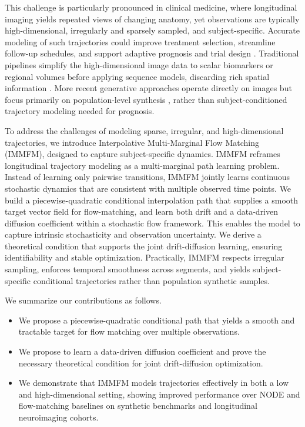 \documentclass[twoside]{article}
\begin{document}
This challenge is particularly pronounced in clinical medicine, where longitudinal imaging yields repeated views of changing anatomy, yet observations are typically high-dimensional, irregularly and sparsely sampled, and subject-specific.
Accurate modeling of such trajectories could improve treatment selection, streamline follow-up schedules, and support adaptive prognosis and trial design \citep{caruana2015longitudinal,locascio2011overview}.
Traditional pipelines simplify the high-dimensional image data to scalar biomarkers or regional volumes before applying sequence models, discarding rich spatial information \citep{lachinov2023learning,lu2024cats,ruan2024comprehensive,lyu2023multimodal,sun2023manifold,dong2023integrated,liu2020optimizing,lei2020deep,nguyen2023clinically}.
More recent generative approaches operate directly on images but focus primarily on population-level synthesis \citep{wolleb2022medfusion,chen2025generative,zhan2024medm2g,choconditional}, rather than subject-conditioned trajectory modeling needed for prognosis.


To address the challenges of modeling sparse, irregular, and high-dimensional trajectories, we introduce Interpolative Multi-Marginal Flow Matching (IMMFM), designed to capture subject-specific dynamics. IMMFM reframes longitudinal trajectory modeling as a multi-marginal path learning problem. Instead of learning only pairwise transitions, IMMFM jointly learns continuous stochastic dynamics that are consistent with multiple observed time points. We build a piecewise-quadratic conditional interpolation path that supplies a smooth target vector field for flow-matching, and learn both drift and a data-driven diffusion coefficient within a stochastic flow framework. This enables the model to capture intrinsic stochasticity and observation uncertainty. We derive a theoretical condition that supports the joint drift-diffusion learning, ensuring identifiability and stable optimization. Practically, IMMFM respects irregular sampling, enforces temporal smoothness across segments, and yields subject-specific conditional trajectories rather than population synthetic samples.


We summarize our contributions as follows.
\begin{itemize}
    \item We propose a piecewise-quadratic conditional path that yields a smooth and tractable target for flow matching over multiple observations.
    \item We propose to learn a data-driven diffusion coefficient and prove the necessary theoretical condition for joint drift-diffusion optimization.
    \item We demonstrate that IMMFM models trajectories effectively in both a low and high-dimensional setting, showing improved performance over NODE and flow-matching baselines on synthetic benchmarks and longitudinal neuroimaging cohorts.
\end{itemize}
\end{document}
